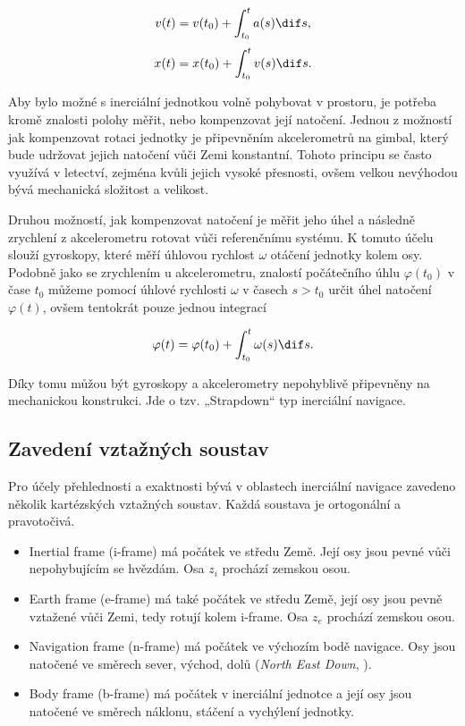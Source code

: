 \begin{equation}
v(t)=v(t_{0}) + \int_{t_{0}}^{t} a(s) \dif s ,
\end{equation}
\begin{equation}
x(t)=x(t_{0}) + \int_{t_{0}}^{t} v(s) \dif s .
\end{equation}

Aby bylo možné s inerciální jednotkou volně pohybovat v prostoru, je potřeba kromě znalosti polohy měřit, nebo kompenzovat její natočení. 
Jednou z možností jak kompenzovat rotaci jednotky je připevněním akcelerometrů na gimbal, který bude udržovat jejich natočení vůči Zemi konstantní. Tohoto principu se často využívá v letectví, zejména kvůli jejich vysoké přesnosti, ovšem velkou nevýhodou bývá mechanická složitost a velikost. \cite{Grewal2013} \cite{Polak2018}

Druhou možností, jak kompenzovat natočení je měřit jeho úhel a následně zrychlení z akcelerometru rotovat vůči referenčnímu systému.\cite{Grewal2013} \cite{Polak2018}
K tomuto účelu slouží gyroskopy, které měří úhlovou rychlost $ \omega $ otáčení jednotky kolem osy. Podobně jako se zrychlením u akcelerometru, znalostí počátečního úhlu $ \varphi (t_{0}) $ v čase $ t_{0} $ můžeme pomocí úhlové rychlosti $ \omega $ v časech $ s>t_{0} $ určit úhel natočení $ \varphi (t) $, ovšem tentokrát pouze jednou integrací

\begin{equation}
\varphi (t)=\varphi (t_{0}) + \int_{t_{0}}^{t} \omega (s) \dif s .
\end{equation}

Díky tomu můžou být gyroskopy a akcelerometry nepohyblivě připevněny na mechanickou konstrukci. Jde o tzv. „Strapdown“ typ inerciální navigace.

\subsection{Zavedení vztažných soustav}
Pro účely přehlednosti a exaktnosti bývá v oblastech inerciální navigace zavedeno několik kartézských vztažných soustav. Každá soustava je ortogonální a pravotočivá. \cite{Pekarek2020} \cite{Tittertonc2004} 

\begin{itemize}
\item Inertial frame (i-frame) má počátek ve středu Země. Její osy jsou pevné vůči nepohybujícím se hvězdám. Osa $ z_{i} $ prochází zemskou osou.
\item Earth frame (e-frame) má také počátek ve středu Země, její osy jsou pevně vztažené vůči Zemi, tedy rotují kolem i-frame. Osa $ z_{e} $ prochází zemskou osou.
\item Navigation frame (n-frame) má počátek ve výchozím bodě navigace. Osy jsou natočené ve směrech sever, východ, dolů (\emph{North East Down}, ).
\item Body frame (b-frame) má počátek v inerciální jednotce a její osy jsou natočené ve směrech náklonu, stáčení a vychýlení jednotky.
\end{itemize}

